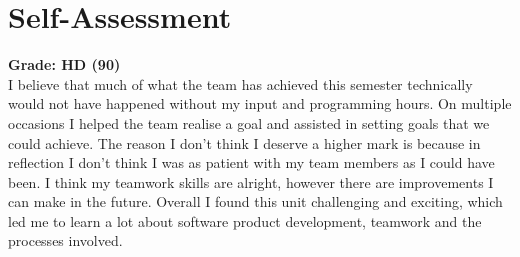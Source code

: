 \documentclass{article}
\begin{document}
\maketitle
\section{Self-Assessment}
{\bf Grade: HD (90)}
\\
I believe that much of what the team has achieved this semester technically would not have happened without my input and programming hours. On multiple occasions I helped the team realise a goal and assisted in setting goals that we could achieve. The reason I don't think I deserve a higher mark is because in reflection I don't think I was as patient with my team members as I could have been. I think my teamwork skills are alright, however there are improvements I can make in the future. Overall I found this unit challenging and exciting, which led me to learn a lot about software product development, teamwork and the processes involved.
\end{document}
